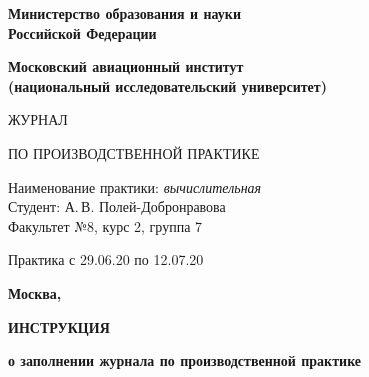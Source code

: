 \documentclass[dvipsnames, pdf, unicode, 12pt, a4paper, oneside, fleqn]{article}
\begin{document}
\begin{titlepage}
\begin{center}
\bfseries{\Large Министерство образования и науки\\Российской Федерации}

\vspace{12pt}

\bfseries{\Large Московский авиационный институт\\ (национальный исследовательский университет)}

\vspace{48pt}



\vspace{36pt}



\vspace{48pt}

{\huge ЖУРНАЛ}

\vspace{12pt}

{\large ПО ПРОИЗВОДСТВЕННОЙ ПРАКТИКЕ}


\end{center}

\vspace{72pt}

\begin{flushleft}
Наименование практики: {\itshape вычислительная}\\
Студент: А.\,В. Полей-Добронравова \\
Факультет №8, курс 2, группа 7 \\
\end{flushleft}

\vspace{12pt}

\begin{flushleft}
Практика с 29.06.20 по 12.07.20
\end{flushleft}

\vfill

\begin{center}
\bfseries Москва, \the\year
\end{center}
\end{titlepage}

\pagebreak

\begin{center}
\bfseries{\large ИНСТРУКЦИЯ }

\vspace{12pt}

\bfseries{о заполнении журнала по производственной практике}
\end{center}
\end{document}

